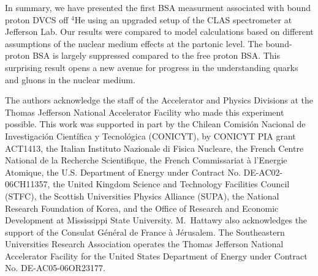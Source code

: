 \documentclass[twocolumn,nofootinbib,showpacs,prl,superscriptaddress,secnumarabic,amssymb,nobibnotes,aps,floatfix]{revtex4}
\begin{document}
In summary, we have presented the first BSA measurment associated with bound 
proton DVCS off $^4$He using an upgraded setup of the CLAS spectrometer at 
Jefferson Lab. Our results were compared to model calculations based on 
different assumptions of the nuclear medium effects at the partonic level. The 
bound-proton BSA is largely suppressed compared to the free proton BSA. This 
surprising result opens a new avenue for progress in the understanding quarks 
and gluons in the nuclear medium.


The authors acknowledge the staff of the Accelerator and Physics Divisions at 
the Thomas Jefferson National Accelerator Facility who made this experiment 
possible. This work was supported in part by the Chilean Comisi\'on Nacional de 
Investigaci\'on Cient\'ifica y Tecnol\'ogica (CONICYT), by CONICYT PIA grant 
ACT1413, the Italian Instituto Nazionale di Fisica Nucleare, the French Centre 
National de la Recherche Scientifique, the French Commissariat \`a l'Energie 
Atomique, the U.S.  Department of Energy under Contract No. DE-AC02-06CH11357, 
the United Kingdom Science and Technology Facilities Council (STFC), the 
Scottish Universities Physics Alliance (SUPA), the National Research Foundation 
of Korea, and the Office of Research and Economic Development at Mississippi 
State University.  M.~Hattawy also acknowledges the support of the Consulat 
G\'en\'eral de France \`a J\'erusalem.  The Southeastern Universities Research 
Association operates the Thomas Jefferson National Accelerator Facility for the 
United States Department of Energy under Contract No. DE-AC05-06OR23177.
\end{document}
